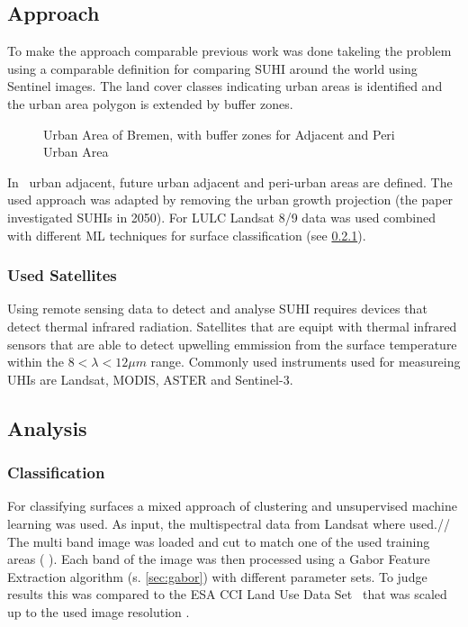 \documentclass[a4paper, english]{article}
\begin{document}
    \subsection{Approach}
    To make the approach comparable previous work was done takeling the problem using a comparable definition for comparing \gls{SUHI} around the world using Sentinel images\cite{Sobrino2020}.
    The land cover classes indicating urban areas is identified and the urban area polygon is extended by buffer zones. 
    \begin{figure}
      
      \caption{Urban Area of Bremen, with buffer zones for Adjacent and Peri Urban Area}
    \end{figure}
    In~\cite{Sobrino2020} urban adjacent, future urban adjacent and peri-urban areas are defined.
    The used approach was adapted by removing the urban growth projection (the paper investigated \glspl{SUHI} in 2050).
    For \gls{LULC} Landsat 8/9 data was used combined with different \gls{ML} techniques for surface classification (see \cref{sec:classification}). %

    
    \subsubsection{Used Satellites}
    Using remote sensing data to detect and analyse \gls{SUHI} requires devices that detect thermal infrared radiation. 
    Satellites that are equipt with thermal infrared sensors that are able to detect upwelling emmission from the surface temperature within the $ 8 < \lambda < 12 \mu m $ range. 
    Commonly used instruments used for measureing UHIs are Landsat, MODIS, ASTER and Sentinel-3. 
    
    \subsection{Analysis}
    
    \subsubsection{Classification }\label{sec:classification}
    For classifying surfaces a mixed approach of clustering and unsupervised machine learning was used. 
    As input, the multispectral data from Landsat where used.// 
    The multi band image was loaded and cut to match one of the used training areas (%
). 
    Each band of the image was then processed using a Gabor Feature Extraction algorithm (s. \cref{sec:gabor}) with different parameter sets. 
    To judge results this was compared to the ESA CCI Land Use Data Set~\cite{landformclassicationusingfuzzykmeans2000} that was scaled up to the used image resolution . %
\end{document}
